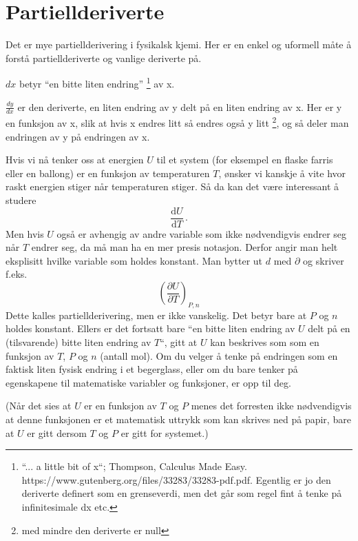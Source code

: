 \documentclass[11pt, A4paper]{article}
\begin{document}
\section{Partiellderiverte}
Det er mye partiellderivering i fysikalsk kjemi. Her er en enkel og uformell måte å forstå partiellderiverte og vanlige deriverte på. 

$dx$ betyr ``en bitte liten endring'' \footnote{``... a little bit of x``; Thompson, Calculus Made Easy. https://www.gutenberg.org/files/33283/33283-pdf.pdf. Egentlig er jo den deriverte definert som en grenseverdi, men det går som regel fint å tenke på infinitesimale dx etc.} av x.

$\frac{dy}{dx}$ er den deriverte, en liten endring av y delt på en
liten endring av x. Her er y en funksjon av x, slik at hvis x endres
litt så endres også y litt \footnote{med mindre den deriverte er null}, og så deler man endringen av y på endringen av x. 

Hvis vi nå tenker oss at energien $U$ til et system (for eksempel en flaske farris
eller en ballong) er en funksjon av temperaturen $T$, ønsker vi kanskje å vite
hvor raskt energien stiger når temperaturen stiger. Så da kan
det være interessant å studere
\begin{equation*}
\label{eq:16}
\frac{\mathrm{d}U}{\mathrm{d}T}\,.
\end{equation*}
Men hvis $U$ også er avhengig av andre variable som ikke nødvendigvis endrer seg når $T$ endrer seg, da må man ha en mer presis notasjon. Derfor  angir man helt
eksplisitt hvilke variable som holdes konstant. Man bytter ut $d$ med
$\partial$ og skriver f.eks.
\begin{equation*}
\label{eq:1}
\left(\frac{\partial U}{\partial T}\right)_{P,n}
\end{equation*}
Dette kalles partiellderivering, men er ikke vanskelig. Det betyr bare at $P$ og $n$ holdes konstant. Ellers er det fortsatt bare
``en bitte liten endring av $U$ delt på en (tilsvarende) bitte liten
endring av $T$``, gitt at $U$ kan beskrives som som en funksjon av
$T$, $P$ og $n$ (antall mol). Om du velger å tenke på endringen som en
faktisk liten fysisk endring i et begerglass, eller om du bare tenker
på egenskapene til matematiske variabler og funksjoner, er opp til
deg.

(Når det sies at $U$ er en funksjon av $T$ og $P$
menes det forresten ikke nødvendigvis at denne funksjonen er et matematisk uttrykk
som kan skrives ned på papir, bare at $U$ er gitt dersom $T$ og $P$
er gitt for systemet.)
\end{document}
